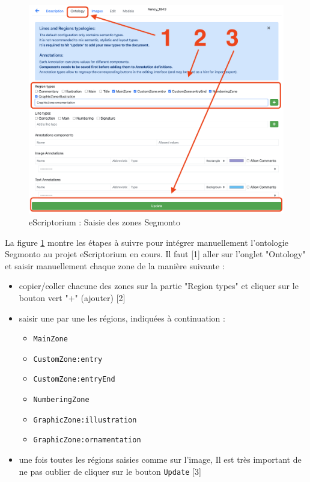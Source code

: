 \documentclass[a4paper,12pt,twoside]{book}
\begin{document}
\begin{figure}[ht]
	\centering
	\includegraphics[scale=0.4]{ontologie_eScriptorium.png}		
	\caption{eScriptorium : Saisie des zones Segmonto}
	\label{saisiesegmonto}
\end{figure}

La figure \ref{saisiesegmonto} montre les étapes à suivre pour intégrer manuellement l'ontologie Segmonto au projet eScriptorium en cours. Il faut [1] aller sur l'onglet "Ontology" et saisir manuellement chaque zone de la manière suivante :
\begin{itemize}
	\item copier/coller chacune des zones sur la partie "Region types" et cliquer sur le bouton vert "+" (ajouter) [2]
		\item saisir une par une les régions, indiquées à continuation :
	\begin{itemize}
		\item \texttt{MainZone}
		\item \texttt{CustomZone:entry}
		\item \texttt{CustomZone:entryEnd}
		\item \texttt{NumberingZone}
		\item \texttt{GraphicZone:illustration}
		\item \texttt{GraphicZone:ornamentation}
	\end{itemize} 

	\item une fois toutes les régions saisies comme sur l'image, 
	Il est très important de ne pas oublier de cliquer sur le bouton \texttt{Update} [3]
\end{itemize}
\end{document}
